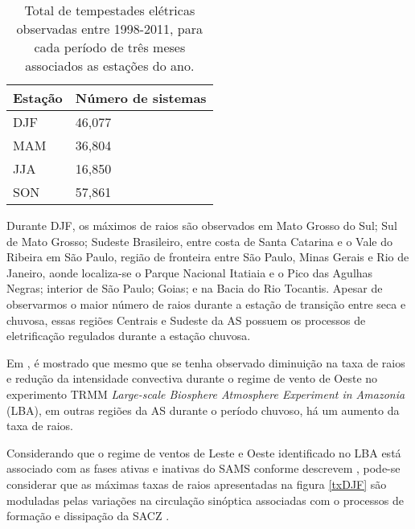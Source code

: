 \begin{table}[!h]
\caption{Total de tempestades elétricas observadas entre 1998-2011, para cada período de três meses associados as estações do ano.}
\label{EstacaoQtd}
\centering
\small
\newcommand{\grayline}{\rowcolor[gray]{.88}}
\renewcommand {\tabularxcolumn }[1]{ >{\arraybackslash }m{#1}}
\begin{tabularx}{\textwidth}{W W} %
\hline \hline 
Estação & Número de sistemas \\[1.5pt]
 \hline
\grayline DJF & 46,077 \\[1.5pt]
MAM & 36,804\\[1.5pt]
\grayline JJA & 16,850\\[1.5pt] 
SON & 57,861\\[1.5pt]
\hline 
\end{tabularx}
\end{table}


Durante DJF, os máximos de raios são observados em Mato Grosso do Sul; Sul de Mato Grosso; Sudeste Brasileiro, entre costa de Santa Catarina e o Vale do Ribeira em São Paulo, região de fronteira entre São Paulo, Minas Gerais e Rio de Janeiro, aonde localiza-se o Parque Nacional Itatiaia e o Pico das Agulhas Negras; interior de São Paulo; Goias; e na Bacia do Rio Tocantis. Apesar de observarmos o maior número de raios durante a estação de transição entre seca e chuvosa, essas regiões Centrais e Sudeste da AS possuem os processos de eletrificação regulados durante a estação chuvosa. 

Em , é mostrado que mesmo que se tenha observado diminuição na taxa de raios e redução da intensidade convectiva durante o regime de vento de Oeste no experimento TRMM \textit{Large-scale Biosphere Atmosphere Experiment in Amazonia} (LBA), em outras regiões da AS durante o período chuvoso, há um aumento da taxa de raios.

Considerando que o regime de ventos de Leste e Oeste identificado no LBA está associado com as fases ativas e inativas do SAMS conforme descrevem , pode-se considerar que as máximas taxas de raios apresentadas na figura \ref{txDJF} são moduladas pelas variações na circulação sinóptica associadas com o processos de formação e dissipação da SACZ \cite{petersen2002trmm,albrecht2011,silva2002lba}.


